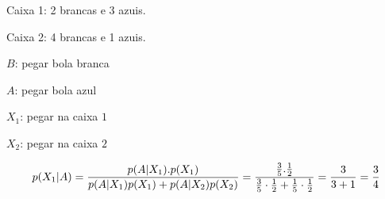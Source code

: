 \item
	Caixa 1: 2 brancas e 3 azuis.

	Caixa 2: 4 brancas e 1 azuis.

	$B$: pegar bola branca

	$A$: pegar bola azul

	$X_1$: pegar na caixa $1$

	$X_2$: pegar na caixa $2$

	\[p({X_1}|A) = \frac{{p(A|{X_1}).p({X_1})}}{{p(A|{X_1})p({X_1}) + p(A|{X_2})p({X_2})}}\\
	= \frac{{\frac{3}{5}.\frac{1}{2}}}{{\frac{3}{5} \cdot \frac{1}{2} + \frac{1}{5} \cdot \frac{1}{2}}} = \frac{3}{{3 + 1}} = \frac{3}{4}
	\]
